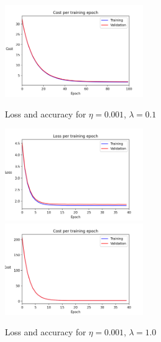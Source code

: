 \documentclass{article}
\begin{document}
\begin{figure}[h!]
		\includegraphics[width=6cm]{../plots/cost_v3.png}
		\caption{Loss and accuracy for $\eta=0.001$, $\lambda=0.1$}
		\vspace{0.2cm}
		\includegraphics[width=6cm]{../plots/loss_v4.png}
		\includegraphics[width=6cm]{../plots/cost_v4.png}
		\caption{Loss and accuracy for $\eta=0.001$, $\lambda=1.0$}
		\vspace{0.2cm}
	\end{figure}
	
\end{document}

